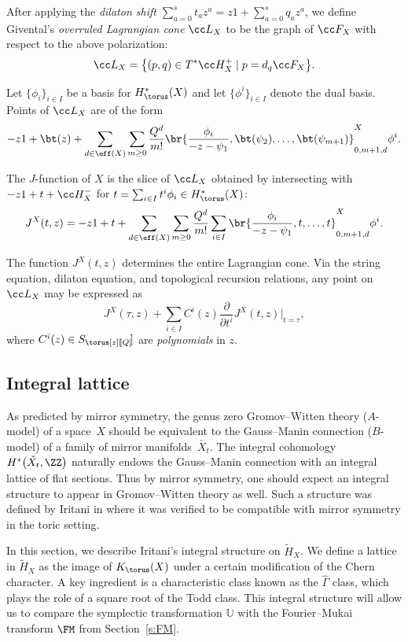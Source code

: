 \begin{Definition}
After applying the \emph{dilaton shift} $\sum_{a=0}^s t_a z^a = z1 + \sum_{a=0}^s q_a z^a$, we define Givental's \emph{overruled Lagrangian cone} $\cc L_X$ to be the graph of $\cc F_X$ with respect to the above polarization:
\[
\cc L_X = \bigl\{ (p, q) \in T^*\cc H_X^+ \mid p = d_q \cc F_X\bigr\}.
\]
\end{Definition}
Let $\{\phi_i\}_{i \in I}$ be a basis for $H^*_\torus(X)$ and let $\{\phi^i\}_{i \in I}$ denote the dual basis.
Points of $\cc L_X$ are of the form
\[
-z 1 + \bt(z) + \sum_{d \in \eff(X)} \sum_{m \geq 0} \frac{Q^d}{m!} \br{\frac{\phi_i}{-z - \psi_1}, \bt(\psi_2), \dots, \bt(\psi_{m+1})}_{0, m+1, d}^X \phi^i.
\]
\begin{Definition}
The $J$-function of $X$ is the slice of $\cc L_X$ obtained by intersecting with $-z 1 + t + \cc H_X^-$ for $t = \sum_{i \in I} t^i \phi_i \in H^*_\torus(X)$:
\[
J^X(t, z) = -z 1 + t+ \sum_{d \in \eff(X)} \sum_{m \geq 0} \frac{Q^d}{m!} \sum_{i \in I}\br{\frac{\phi_i}{-z - \psi_1}, t, \dots, t}_{0, m+1, d}^X \phi^i.
\]

\end{Definition}
The function $J^X(t, z)$ determines the entire Lagrangian cone. Via the string equation, dilaton equation, and topological recursion relations, any point on $\cc L_X$ may be expressed as
\[
J^X(\tau , z) + \sum_{i \in I} C^i(z) \frac{\partial}{\partial{t^i}} J^X(t, z)|_{t=\tau},
\]
where $C^i(z) \in S_\torus[z][\![Q]\!]$ are \emph{polynomials} in $z$.


\subsection{Integral lattice}
As predicted by mirror symmetry, the genus zero Gromov--Witten theory ($A$-model) of a space~$X$ should be equivalent to the Gauss--Manin connection ($B$-model) of a family of mirror manifolds~$\check{X_t}$. The integral cohomology~$H^*\bigl(\check{X_t}, \ZZ\bigr)$ naturally endows the Gauss--Manin connection with an integral lattice of flat sections. Thus by mirror symmetry, one should expect an integral structure to appear in Gromov--Witten theory as well. Such a structure was defined by Iritani in \cite{IriInt} where it was verified to be compatible with mirror symmetry in the toric setting.

In this section, we describe Iritani's integral structure on $\tilde H_X$. We define a lattice in $\tilde H_X$ as the image of $K_\torus(X)$ under a certain modification of the Chern character. A key ingredient is a characteristic class known as the $\hat\Gamma$ class, which plays the role of a square root of the Todd class. This integral structure will allow us to compare the symplectic transformation $\mathbb{U}$ with the Fourier--Mukai transform $\FM$ from Section~\ref{s:FM}.

